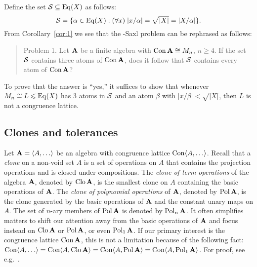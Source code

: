 Define the set $\mathcal{S}\subseteq \operatorname{Eq}(X)$ as follows:
\[
\mathcal{S} = \{ \alpha \in \operatorname{Eq}(X) : (\forall x) \; |x/\alpha|  
= \sqrt{|X|} = |X/\alpha|\}.
\]
From Corollary~\ref{cor:1} we see that the \Palfy-Saxl problem can be rephrased
as follows:

\medskip

\begin{quote}
  {\sc Problem 1.} Let $\mathbf{A}$ be a finite algebra with $\operatorname{Con} \mathbf{A} \cong M_n$, $n\geq 4$. 
  If the set $\mathcal{S}$ contains three atoms of $\operatorname{Con} \mathbf{A}$, does it follow that $\mathcal{S}$ contains 
  every atom of $\operatorname{Con} \mathbf{A}$?
\end{quote}
\medskip


\noindent To prove that the answer is ``yes,'' it suffices to show that 
whenever $M_n \cong L \leqslant \operatorname{Eq}(X)$ has 3 atoms in $\mathcal{S}$ and
an atom $\beta$ with $|x/\beta| < \sqrt{|X|}$, then $L$ is not a
congruence lattice.  

\subsection{Clones and tolerances}
Let $\bA =  \<A, \dots \>$ be an algebra with congruence lattice $\Con\<A, \dots \>$.
Recall that a \emph{clone} on a non-void set $A$ is a set of operations on $A$
that contains the projection operations and is closed under compositions.
The \emph{clone of term operations} of the algebra $\mathbf{A}$, denoted by $\operatorname{Clo} \mathbf{A}$,
is the smallest clone on $A$ containing the basic operations of $\mathbf{A}$.
The \emph{clone of polynomial operations} of $\mathbf{A}$, denoted by
$\operatorname{Pol} \mathbf{A}$, is the clone generated by the basic operations
of $\mathbf{A}$ and the constant unary maps on $A$. The set of $n$-ary members of
$\operatorname{Pol} \mathbf{A}$ is denoted by $\operatorname{Pol}_n \mathbf{A}$.
It often simplifies matters to shift our attention away from the 
basic operations of $\mathbf{A}$ and focus instead on $\operatorname{Clo}\mathbf{A}$ or $\operatorname{Pol}\mathbf{A}$, or even 
$\operatorname{Pol}_1\mathbf{A}$.  If our primary interest is the congruence lattice $\operatorname{Con} \mathbf{A}$,
this is not a limitation because of the following fact:
$\Con\<A, \dots \>  = \Con \<A, \Clo \bA\> = \Con \<A, \Pol \bA\>=
\Con \<A, \Pol_1 \bA\>$. 
For proof, see e.g.~\cite[Theorem~4.18]{alvi:1987}.

